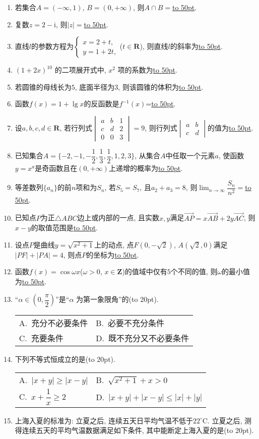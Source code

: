 \documentclass[10pt,a4paper]{article}
\newcommand{\blank}[1]{\underline{\hbox to #1pt{}}}
\newcommand{\bracket}[1]{(\hbox to #1pt{})}
\newcommand{\twoch}[4]{\par\begin{tabular}{p{.46\textwidth}p{.46\textwidth}}
A.~#1& B.~#2\\
C.~#3& D.~#4
\end{tabular}}
\begin{document}
\begin{enumerate}[1.]
\item 若集合$A=(-\infty ,1)$, $B=(0,+\infty)$, 则$A\cap B=$\blank{50}.
\item 复数$z=2-\mathrm{i}$, 则$|z|=$\blank{50}.
\item 直线$l$的参数方程为$\begin{cases} x=2+t, \\ y=1+2t, \end{cases}$($t\in \mathbf{R}$), 则直线$l$的斜率为\blank{50}.
\item $(1+2x)^{10}$ 的二项展开式中, $x^2$ 项的系数为\blank{50}.
\item 若圆锥的母线长为$5$, 底面半径为$3$, 则该圆锥的体积为\blank{50}.
\item 函数$f(x)=1+\lg x$的反函数是$f^{-1}(x)$=\blank{50}.
\item 设$a,b,c,d\in \mathbf{R}$, 若行列式$\begin{vmatrix}    a & b & 1  \\ c & d & 2  \\ 0 & 0 & 3  \end{vmatrix}=9$, 则行列式$\begin{vmatrix} a & b  \\ c & d  \end{vmatrix}$的值为\blank{50}.
\item 已知集合$A=\{-2,-1,-\dfrac 12,\dfrac 13,\dfrac 12,1,2,3\}$, 从集合$A$中任取一个元素$a$, 使函数$y=x^a$是奇函数且在$(0,+\infty)$上递增的概率为\blank{50}.
\item 等差数列$\{a_n\}$的前$n$项和为$S_n$, 若$S_5=S_7$, 且$a_2+a_3=8$, 则$\displaystyle\lim_{n\to\infty}\dfrac{S_n}{n^2}=$\blank{50}.
\item 已知点$P$为正$\triangle ABC$边上或内部的一点, 且实数$x,y$满足$\overrightarrow{AP}=x\overrightarrow{AB}+2y\overrightarrow{AC}$, 则$x-y$的取值范围是\blank{50}.
\item 设点$P$是曲线$y=\sqrt{x^2+1}$上的动点, 点$F(0,-\sqrt 2)$, $A(\sqrt 2,0)$满足$|PF|+|PA|=4$, 则点$P$的坐标为\blank{50}.
\item 函数$f(x)=\cos \omega x$($\omega >0$, $x\in \mathbf{Z}$)的值域中仅有$5$个不同的值, 则$\omega$的最小值为\blank{50}.
\item ``$\alpha \in (0,\dfrac{\pi}2)$''是``$\alpha$ 为第一象限角''的\bracket{20}.
\twoch{充分不必要条件}{必要不充分条件}{充要条件}{既不充分又不必要条件}\item 下列不等式恒成立的是\bracket{20}.
\twoch{$|x+y|\ge |x-y|$}{$\sqrt{x^2+1}+x>0$}{$x+\dfrac 1x\ge 2$}{$|x+y|+|x-y|\le |x|+|y|$}
\item 上海入夏的标准为: 立夏之后, 连续五天日平均气温不低于$22^\circ\text{C}$. 立夏之后, 测得连续五天的平均气温数据满足如下条件, 其中能断定上海入夏的是\bracket{20}.

\end{enumerate}
\end{document}
